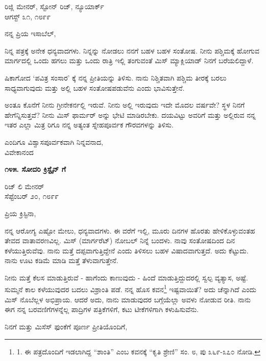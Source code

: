 \begin{flushright}
ರಿಜ್ಲಿ ಮೇನರ್, ಸ್ಟೋನ್ ರಿಜ್, ನ್ಯೂಯಾರ್ಕ್\\ಆಗಸ್ಟ್ ೩೧, ೧೮೯೯
\end{flushright}

ನನ್ನ ಪ್ರಿಯ ಇಸಾಬೆಲ್,

ನಿನ್ನ ಪತ್ರಕ್ಕೆ ಅನೇಕ ಧನ್ಯವಾದಗಳು. ನಿನ್ನನ್ನು ನೋಡಲು ನನಗೆ ಬಹಳ ಬಹಳ ಸಂತೋಷ. ನೀನು ಪಶ್ಚಿಮಕ್ಕೆ ಹೋಗುವ ಮಾರ್ಗದಲ್ಲಿ ಒಂದು ಹಗಲು ಮತ್ತು ಒಂದು ರಾತ್ರಿ ಇಲ್ಲಿ ತಂಗುವಂತೆ ಮಿಸ್ ಮ್ಯಾಕ್ಲಿಯಾಡ್ ನಿನಗೆ ಬರೆಯಲಿದ್ದಾಳೆ.

ಷಿಕಾಗೋದ ‘ಪವಿತ್ರ ಸಂಸಾರ’ ಕ್ಕೆ ನನ್ನ ಪ್ರೀತಿಯನ್ನು ತಿಳಿಸು. ನಾನು ನಿಶ್ಚಿತವಾಗಿ ಪಶ್ಚಿಮ ತೀರಕ್ಕೆ ಬರಲು ಸಾಧ್ಯವಾಗುವುದು ಮತ್ತು ಅಲ್ಲಿ ಬಹಳ ಸಂತೋಷಪಡುವೆನು ಎಂದು ಭಾವಿಸುತ್ತೇನೆ.

ಅಂತೂ ಕೊನೆಗೆ ನೀನು ಗ್ರೀನೇಕರ್ನಲ್ಲಿ ಇರುವೆ. ನೀನು ಅಲ್ಲಿ ಇರುವುದು ಇದೇ ಮೊದಲ ವರ್ಷವೇ? ಸ್ಥಳ ನಿನಗೆ ಹೇಗೆನ್ನಿಸುತ್ತವೆ? ನೀನು ಮಿಸ್ ಫಾರ್ಮರ್ ಅನ್ನು ಭೇಟಿ ಮಾಡಿರಬೇಕು. ದಯವಿಟ್ಟು ಅವರಿಗೆ ಮತ್ತು ಅಲ್ಲಿರುವ ನನ್ನ ಇತರ ಎಲ್ಲಾ ಮಿತ್ರ ರಿಗೂ ನನ್ನ ಅತ್ಯಂತ ಸ್ನೇಹಪೂರ್ವಕ ಗೌರವಗಳನ್ನು ತಿಳಿಸು.

\begin{flushright}
ಎಂದಿಗೂ ವಿಶ್ವಾಸಪೂರ್ವಕವಾಗಿ ನಿನ್ನವನಾದ,\\ವಿವೇಕಾನಂದ
\end{flushright}

\begin{center}
\textbf{೧೪೫. ಸೋದರಿ ಕ್ರಿಸ್ಟೈನ್ ಗೆ}
\end{center}

\begin{flushright}
ರಿಜ್ ಲಿ ಮೇನರ್\\ಸೆಪ್ಟೆಂಬರ್ ೨೦, ೧೮೯೯
\end{flushright}

ಪ್ರಿಯ ಕ್ರಿಸ್ಟಿನಾ,

ನನ್ನ ಆರೋಗ್ಯ ಎಷ್ಟೋ ಮೇಲು, ಧನ್ಯವಾದಗಳು. ಈ ವರೆಗೆ ಇಲ್ಲಿ, ಮೂರು ದಿನಗಳ ಹೊರತು ಹೇಳಿಕೊಳ್ಳುವಂತಹ ತೇವದ ವಾತಾವರಣವಿಲ್ಲ. ಮಿಸ್ (ಮಾರ್ಗರೆಟ್) ನೋಬಲ್ ನಿನ್ನೆ ಬಂದಳು. ನಾವು ಸಂತೋಷದಿಂದ ದಿನ ಕಳೆಯುತ್ತಿರುವೆವು. ನಾನು ಮತ್ತೆ ದಪ್ಪವಾಗುತ್ತಿದ್ದೇನೆ ಎಂದು ತಿಳಿಸಲು ಬಹಳ ವಿಷಾದವಾಗುತ್ತದೆ. ಅದು ಕೆಟ್ಟುದು. ನಾನು ಊಟ ಕಡಿಮೆ ಮಾಡಿ ಮತ್ತೆ ತೆಳುವಾಗುತ್ತೇನೆ.

ನೀನು ಮತ್ತೆ ಕೆಲಸ ಮಾಡುತ್ತಿರುವೆ - ಹಾಗೆಂದು ಕಾಣುವುದು - ಹಿಂದೆ ಮಾಡುತ್ತಿದ್ದುದರಲ್ಲಿ ಸ್ವಲ್ಪ ವ್ಯತ್ಯಾಸ, ಅಷ್ಟೆ. ಸುಮ್ಮನೆ ಕಾಲ ಕಳೆಯುವುದರ ಬದಲು ವಿಶ್ರಾಂತಿ ಪಡೆ. ನನ್ನ ಹೊಸ ಕವನ\footnote{1. ಈ ಪತ್ರದೊಂದಿಗೆ ಇಡಲಾಗಿದ್ದ “ಶಾಂತಿ” ಎಂಬ ಕವನಕ್ಕೆ “ಕೃತಿ ಶ್ರೇಣಿ” ಸಂ. ೮, ಪು ೩೬೯-೩೭೦ ನೋಡಿ.} ಇಷ್ಟವಾಯಿತೆ? ಅದು ಚೆನ್ನಾಗಿದೆ ಎಂದು ಮಿಸ್ ನೊಬೆಲ್ಲಳ ಅಭಿಪ್ರಾಯ. ಆದರೆ ಅದು, ನಾನು ಮಾಡುವುದರ ಬಗ್ಗೆಯೆಲ್ಲಾ ಅವಳು ನೋಡುವ ರೀತಿ. ನಾನು ಈಗ ನನ್ನ ಬರವಣಿಗೆಗಳನ್ನೆಲ್ಲ ಪಾದ್ರಿಗಳ ಪತ್ರಿಕೆಗಳಿಗೆ, ಕಟು ಟೀಕೆಗಳಿಗಾಗಿ ಕಳುಹಿಸುವೆನು.

ನಿನಗೆ ಮತ್ತು ಮಿಸೆಸ್ ಫುಂಕೆಗೆ ಪೂರ್ಣ ಪ್ರೀತಿಯೊಂದಿಗೆ,

